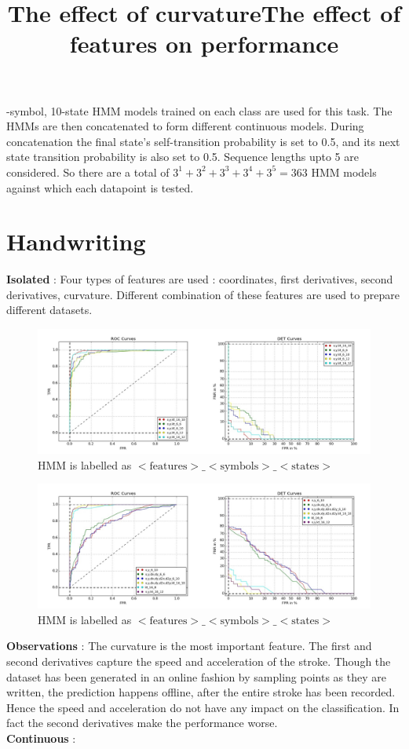 \documentclass{article}
\begin{document}
-symbol, 10-state HMM models trained on each class are used for this task. The HMMs are then concatenated to form different continuous models. During concatenation the final state's self-transition probability is set to 0.5, and its next state transition probability is also set to 0.5. Sequence lengths upto 5 are considered. So there are a total of $ 3^1 + 3^2 + 3^3 + 3^4 + 3^5 = 363$ HMM models against which each datapoint is tested.

\section{Handwriting}
\textbf{Isolated} : Four types of features are used : coordinates, first derivatives, second derivatives, curvature. Different combination of these features are used to prepare different datasets.

\begin{figure}[h!]
\centering
\title{The effect of curvature}
\includegraphics[width=\textwidth]{handwriting/plots/hmm/roc_det_x,y,kt.jpg}
\caption{HMM is labelled as $<\text{features}>\_<\text{symbols}>\_<\text{states}>$}
\end{figure}

\begin{figure}[h!]
\centering
\title{The effect of features on performance}
\includegraphics[width=\textwidth]{handwriting/plots/hmm/roc_det_compare.jpg}
\caption{HMM is labelled as $<\text{features}>\_<\text{symbols}>\_<\text{states}>$}
\end{figure}

\newpage
\textbf{Observations} : The curvature is the most important feature. The first and second derivatives capture the speed and acceleration of the stroke. Though the dataset has been generated in an online fashion by sampling points as they are written, the prediction happens offline, after the entire stroke has been recorded. Hence the speed and acceleration do not have any impact on the classification. In fact the second derivatives make the performance worse.\\
\textbf{Continuous} : 
\end{document}
